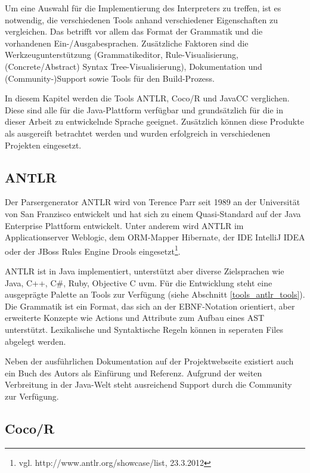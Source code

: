 Um eine Auswahl für die Implementierung des Interpreters zu treffen, ist es not\-wen\-dig, die verschiedenen Tools anhand verschiedener Eigenschaften zu vergleichen. Das betrifft vor allem das Format der Grammatik und die vorhandenen Ein-/Ausgabesprachen.
Zu\-sätz\-liche Faktoren sind die Werkzeugunterstützung (Grammatikeditor, Rule-Visualisierung, (Concrete/Abstract) Syntax Tree-Visualisierung), Dokumentation und (Community-)Support sowie Tools für den Build-Prozess.

In diesem Kapitel werden die Tools ANTLR, Coco/R und JavaCC verglichen. Diese sind alle für die Java-Plattform verfügbar und grund\-sätz\-lich für die in dieser Arbeit zu entwickelnde Sprache geeignet. Zu\-sätz\-lich können diese Produkte als ausgereift betrachtet werden und wurden erfolgreich in verschiedenen Projekten eingesetzt.


\subsection{ANTLR}

Der Parsergenerator ANTLR wird von Terence Parr seit 1989 an der Universität von San Franzisco entwickelt und hat sich zu einem Quasi-Standard auf der Java Enterprise Plattform entwickelt. Unter anderem wird ANTLR im Applicationserver Weblogic, dem ORM-Mapper Hibernate, der IDE IntelliJ IDEA oder der JBoss Rules Engine Drools eingesetzt\footnote{vgl. http://www.antlr.org/showcase/list, 23.3.2012}.

ANTLR ist in Java implementiert, unterstützt aber diverse Zielsprachen wie Java, C++, C\#, Ruby, Objective C uvm. Für die Entwicklung steht eine ausgeprägte Palette an Tools zur Verfügung (siehe Abschnitt \ref{tools_antlr_tools}). Die Grammatik ist ein Format, das sich an der EBNF-Notation orientiert, aber erweiterte Konzepte wie Actions und Attribute zum Aufbau eines AST unterstützt. Lexikalische und Syntaktische Regeln können in seperaten Files abgelegt werden.

Neben der ausführlichen Dokumentation auf der Projektwebseite existiert auch ein Buch des Autors als Einfürung und Referenz\cite{Parr07}. Aufgrund der weiten Verbreitung in der Java-Welt steht ausreichend Support durch die Community zur Verfügung.



\subsection{Coco/R} 

